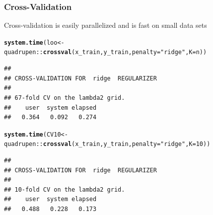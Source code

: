 \documentclass[10pt, c, xcolor=x11names]{beamer}\usepackage[]{graphicx}\usepackage[]{color}
\makeatletter
\newcommand{\hlnum}[1]{\textcolor[rgb]{0.686,0.059,0.569}{#1}}%
\newcommand{\hlstr}[1]{\textcolor[rgb]{0.192,0.494,0.8}{#1}}%
\newcommand{\hlopt}[1]{\textcolor[rgb]{0,0,0}{#1}}%
\newcommand{\hlstd}[1]{\textcolor[rgb]{0.345,0.345,0.345}{#1}}%
\newcommand{\hlkwb}[1]{\textcolor[rgb]{0.69,0.353,0.396}{#1}}%
\newcommand{\hlkwc}[1]{\textcolor[rgb]{0.333,0.667,0.333}{#1}}%
\newcommand{\hlkwd}[1]{\textcolor[rgb]{0.737,0.353,0.396}{\textbf{#1}}}%
\newenvironment{kframe}{%
 \def\at@end@of@kframe{}%
 \ifinner\ifhmode%
  \def\at@end@of@kframe{\end{minipage}}%
  \begin{minipage}{\columnwidth}%
 \fi\fi%
 \def\FrameCommand##1{\hskip\@totalleftmargin \hskip-\fboxsep
 \colorbox{shadecolor}{##1}\hskip-\fboxsep
     \hskip-\linewidth \hskip-\@totalleftmargin \hskip\columnwidth}%
 \MakeFramed {\advance\hsize-\width
   \@totalleftmargin\z@ \linewidth\hsize
   \@setminipage}}%
 {\par\unskip\endMakeFramed%
 \at@end@of@kframe}
\newenvironment{knitrout}{}{} %
\makeatother
\begin{document}
\begin{frame}[containsverbatim]
  \frametitle{Cross-Validation}
  
  Cross-validation is easily parallelized and is fast on small data sets

\begin{knitrout}\scriptsize
{}\color{fgcolor}\begin{kframe}
\begin{alltt}
\hlkwd{system.time}\hlstd{(loo} \hlkwb{<-} \hlstd{quadrupen}\hlopt{::}\hlkwd{crossval}\hlstd{(x_train,y_train,} \hlkwc{penalty} \hlstd{=}  \hlstr{"ridge"}\hlstd{,} \hlkwc{K} \hlstd{= n))}
\end{alltt}
\begin{verbatim}
## 
## CROSS-VALIDATION FOR  ridge  REGULARIZER 
## 
## 67-fold CV on the lambda2 grid.
##    user  system elapsed 
##   0.364   0.092   0.274
\end{verbatim}
\end{kframe}
\end{knitrout}

\begin{knitrout}\scriptsize
{}\color{fgcolor}\begin{kframe}
\begin{alltt}
\hlkwd{system.time}\hlstd{(CV10} \hlkwb{<-} \hlstd{quadrupen}\hlopt{::}\hlkwd{crossval}\hlstd{(x_train,y_train,} \hlkwc{penalty} \hlstd{=}  \hlstr{"ridge"}\hlstd{,} \hlkwc{K} \hlstd{=} \hlnum{10}\hlstd{))}
\end{alltt}
\begin{verbatim}
## 
## CROSS-VALIDATION FOR  ridge  REGULARIZER 
## 
## 10-fold CV on the lambda2 grid.
##    user  system elapsed 
##   0.488   0.228   0.173
\end{verbatim}
\end{kframe}
\end{knitrout}

\end{frame}
\end{document}
